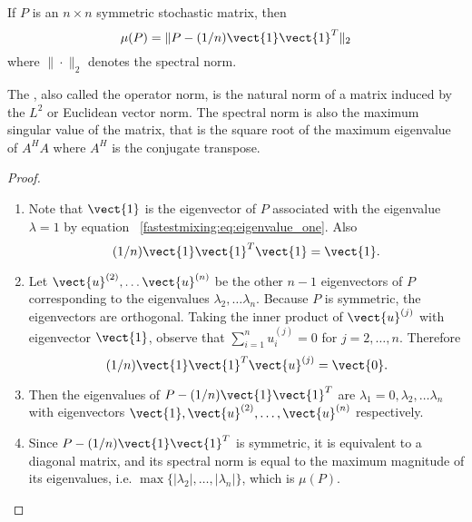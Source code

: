 \documentclass[12pt]{article}
\begin{document}
\begin{lemma}
    \label{fastestmixing:lemma:one} If \( P \) is an \( n \times n \)
    symmetric stochastic matrix, then
    \[
        \mu(P) = \| P - (1/n) \vect{1}\vect{1}^T \|_2
    \] where \( \| \cdot \|_2 \) denotes the spectral norm.
\end{lemma}

\begin{remark}
    The %
    , also called the operator norm, is the natural norm of a matrix
    induced by the \( L^2 \) or Euclidean vector norm.  The spectral
    norm is also the maximum singular value of the matrix, that is the
    square root of the maximum eigenvalue of \( A^H A \) where \( A^H \)
    is the conjugate transpose.
\end{remark}

\begin{proof}
    \begin{enumerate}
        \item
            Note that \( \vect{1} \) is the eigenvector of \( P \)
            associated with the eigenvalue \( \lambda = 1 \) by
            equation~%
            \eqref{fastestmixing:eq:eigenvalue_one}.  Also
            \[
                (1/n) \vect{1}\vect{1}^T \vect{1} = \vect{1}.
            \]
        \item
            Let \( \vect{u}^{(2)}, \dots \vect{u}^{(n)} \) be the other \(
            n-1 \) eigenvectors of \( P \) corresponding to the
            eigenvalues \( \lambda_2, \dots \lambda_n \).  Because \( P \)
            is symmetric, the eigenvectors are orthogonal.  Taking the
            inner product of \( \vect{u}^{(j)} \) with eigenvector \(
            \vect{1} \), observe that \( \sum_{i=1}^n u_i^{(j)} = 0 \)
            for \( j=2,\dots, n \).  Therefore
            \[
                (1/n) \vect{1}\vect{1}^T \vect{u}^{(j)} = \vect{0}.
            \]
        \item
            Then the eigenvalues of \( P - (1/n)\vect{1}\vect{1}^T \)
            are \( \lambda_1 = 0, \lambda_2, \dots \lambda_n \) with
            eigenvectors \( \vect{1}, \vect{u}^{(2)}, \dots, \vect{u}^{(n)}
            \) respectively.
        \item
            Since \( P - (1/n) \vect{1}\vect{1}^T \) is symmetric, it is
            equivalent to a diagonal matrix, and its spectral norm is
            equal to the maximum magnitude of its eigenvalues, i.e. \(
            \max\{ {|\lambda_2|, \dots, |\lambda_n|}\} \), which is \(
            \mu(P) \).
    \end{enumerate}
\end{proof}
\end{document}
